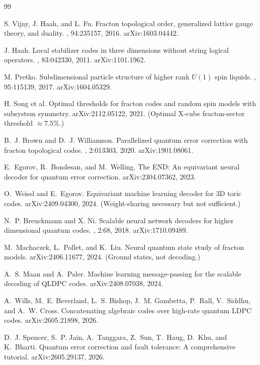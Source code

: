 \documentclass[11pt,a4paper]{article}
\begin{document}
\begin{thebibliography}{99}

 S. Vijay, J. Haah, and L. Fu.
\newblock Fracton topological order, generalized lattice gauge theory, and duality.
, 94:235157, 2016. arXiv:1603.04442.

 J. Haah.
\newblock Local stabilizer codes in three dimensions without string logical operators.
, 83:042330, 2011. arXiv:1101.1962.

 M. Pretko.
\newblock Subdimensional particle structure of higher rank $U(1)$ spin liquids.
, 95:115139, 2017. arXiv:1604.05329.

 H. Song et al.
\newblock Optimal thresholds for fracton codes and random spin models with subsystem symmetry.
\newblock arXiv:2112.05122, 2021. (Optimal X-cube fracton-sector threshold $\approx 7.5\%$.)

 B.~J. Brown and D.~J. Williamson.
\newblock Parallelized quantum error correction with fracton topological codes.
, 2:013303, 2020. arXiv:1901.08061.

 E.~Egorov, R.~Bondesan, and M.~Welling.
\newblock The END: An equivariant neural decoder for quantum error correction.
\newblock arXiv:2304.07362, 2023.

 O.~Weissl and E.~Egorov.
\newblock Equivariant machine learning decoder for 3D toric codes.
\newblock arXiv:2409.04300, 2024. (Weight-sharing necessary but not sufficient.)

 N.~P. Breuckmann and X. Ni.
\newblock Scalable neural network decoders for higher dimensional quantum codes.
, 2:68, 2018. arXiv:1710.09489.

 M.~Machaczek, L.~Pollet, and K.~Liu.
\newblock Neural quantum state study of fracton models.
\newblock arXiv:2406.11677, 2024. (Ground states, not decoding.)

 A.~S. Maan and A.~Paler.
\newblock Machine learning message-passing for the scalable decoding of QLDPC codes.
\newblock arXiv:2408.07038, 2024.

 A.~Wills, M.~E. Beverland, L.~S. Bishop, J.~M. Gambetta, P.~Rall, V.~Siddhu, and A.~W. Cross.
\newblock Concatenating algebraic codes over high-rate quantum {LDPC} codes.
\newblock arXiv:2605.21898, 2026.

 D.~J. Spencer, S.~P. Jain, A.~Tanggara, Z.~Sun, T.~Haug, D.~Khu, and K.~Bharti.
\newblock Quantum error correction and fault tolerance: A comprehensive tutorial.
\newblock arXiv:2605.29137, 2026.

\end{thebibliography}
\end{document}
